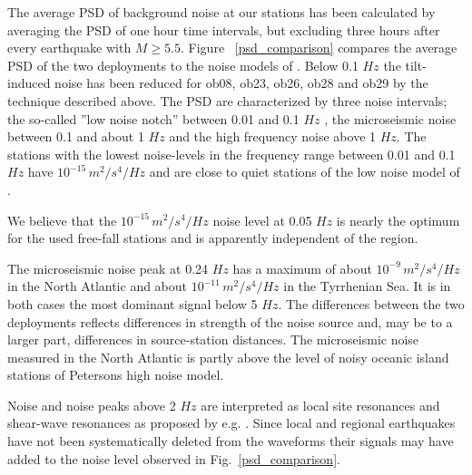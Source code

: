 \documentclass{article}
\begin{document}
{The average PSD of background noise at our stations 
has been calculated by averaging the PSD of one hour time intervals,
but excluding three hours after every earthquake with $M \geq
5.5$. Figure ~\ref{psd_comparison} compares the average PSD of the two deployments 
to the noise models of \cite{peterson:93}.
Below 0.1 $Hz$
the tilt-induced noise has been reduced for
ob08, ob23, ob26, ob28 and ob29 by the technique 
described above.
The PSD are characterized by three noise 
intervals;
the so-called ''low noise notch'' between 0.01 and 0.1 $Hz$ 
\cite[e.g.,][]{webb:98}, 
the microseismic noise between 0.1 and about 1 $Hz$ and 
the high frequency  noise above 1 $Hz$.
The stations with the lowest noise-levels in the frequency range between 
0.01 and 0.1 $Hz$ have $10^{-15} \, m^2 / s^4 / Hz$ and are close to
quiet stations of the low noise model of \cite{peterson:93}.

We believe that the $10^{-15} \, m^2 / s^4 / Hz$ noise level at 
0.05 $Hz$ is nearly the optimum for the used free-fall 
stations and is apparently independent of the region. 

The microseismic noise peak at 0.24 $Hz$ 
has a maximum of  
about $10^{-9} \, m^2 / s^4 / Hz$ in the North Atlantic and 
about $10^{-11} \, m^2 / s^4 / Hz$ in the Tyrrhenian Sea. 
It is in both cases the most dominant signal below 5 $Hz$.
The differences between the two deployments reflects 
differences in strength of the noise source and, 
may be to a larger part, differences in 
source-station distances. 
The microseismic noise measured in the North Atlantic is 
partly above the level of noisy oceanic island stations of
Petersons 
high noise model.

Noise and noise peaks above 2 $Hz$ are interpreted as 
local site resonances and shear-wave resonances as proposed by 
e.g.  \cite{godin:99}.
Since local and regional earthquakes have not been systematically 
deleted from the waveforms their signals 
may have added to the noise level observed in 
Fig.~\ref{psd_comparison}.

}
\end{document}
